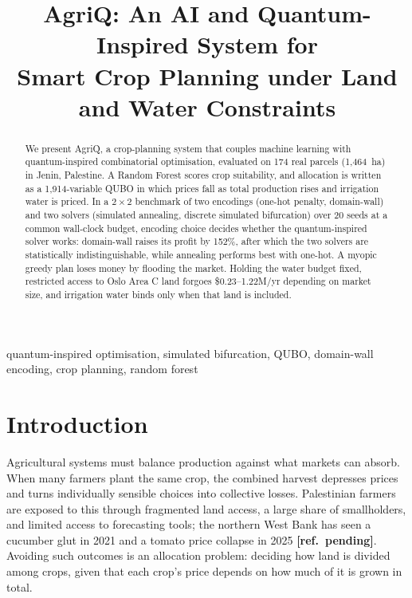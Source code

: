 \documentclass[conference,a4paper]{IEEEtran}
\newcommand{\refpending}{\textbf{[ref.\ pending]}}
\begin{document}
\title{AgriQ: An AI and Quantum-Inspired System for\\Smart Crop Planning under Land and Water Constraints}

\author{
}

\maketitle
\thispagestyle{empty}

\begin{abstract}
We present AgriQ, a crop-planning system that couples machine learning with
quantum-inspired combinatorial optimisation, evaluated on 174 real parcels
(1{,}464~ha) in Jenin, Palestine. A Random Forest scores crop suitability, and
allocation is written as a 1{,}914-variable QUBO in which prices fall as total
production rises and irrigation water is priced. In a $2\times2$ benchmark of
two encodings (one-hot penalty, domain-wall) and two solvers (simulated
annealing, discrete simulated bifurcation) over 20 seeds at a common
wall-clock budget, encoding choice decides whether the quantum-inspired solver
works: domain-wall raises its profit by 152\%, after which the two solvers are
statistically indistinguishable, while annealing performs best with one-hot.
A myopic greedy plan loses money by flooding the market. Holding the water
budget fixed, restricted access to Oslo Area C land forgoes \$0.23--1.22M/yr
depending on market size, and irrigation water binds only when that land is
included.
\end{abstract}

\begin{IEEEkeywords}
quantum-inspired optimisation, simulated bifurcation, QUBO, domain-wall
encoding, crop planning, random forest
\end{IEEEkeywords}

\section{Introduction}

Agricultural systems must balance production against what markets can absorb.
When many farmers plant the same crop, the combined harvest depresses prices
and turns individually sensible choices into collective losses. Palestinian
farmers are exposed to this through fragmented land access, a large share of
smallholders, and limited access to forecasting tools; the northern West Bank
has seen a cucumber glut in 2021 and a tomato price collapse in 2025
\refpending. Avoiding such outcomes is an allocation problem: deciding how land
is divided among crops, given that each crop's price depends on how much of it
is grown in total.
\end{document}
